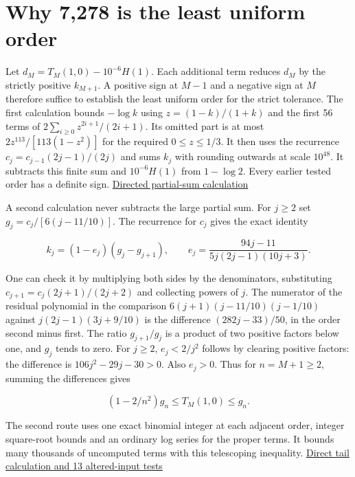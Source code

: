 \clearpage

\section{Why 7,278 is the least uniform order}\label{why-7278-is-the-least-uniform-order}

Let \(d_M=T_M(1,0)-10^{-6}H(1)\). Each additional term reduces \(d_M\) by the strictly positive \(k_{M+1}\). A positive sign at \(M-1\) and a negative sign at \(M\) therefore suffice to establish the least uniform order for the strict tolerance. The first calculation bounds \(-\log k\) using \(z=(1-k)/(1+k)\) and the first 56 terms of \(2\sum_{i\ge0}z^{2i+1}/(2i+1)\). Its omitted part is at most \(2z^{113}/[113(1-z^2)]\) for the required \(0\le z\le1/3\). It then uses the recurrence \(c_j=c_{j-1}(2j-1)/(2j)\) and sums \(k_j\) with rounding outwards at scale \(10^{48}\). It subtracts this finite sum and \(10^{-6}H(1)\) from \(1-\log2\). Every earlier tested order has a definite sign. \href{https://github.com/sepahead/pid-rs/blob/main/audit/research/angular-unit-boundary/prefix_order.py}{Directed partial-sum calculation}

A second calculation never subtracts the large partial sum. For \(j\ge2\) set \(g_j=c_j/[6(j-11/10)]\). The recurrence for \(c_j\) gives the exact identity

\[
k_j=(1-e_j)(g_j-g_{j+1}),\qquad e_j=\frac{94j-11}{5j(2j-1)(10j+3)}.
\]

One can check it by multiplying both sides by the denominators, substituting \(c_{j+1}=c_j(2j+1)/(2j+2)\) and collecting powers of \(j\). The numerator of the residual polynomial in the comparison \(6(j+1)(j-11/10)(j-1/10)\) against \(j(2j-1)(3j+9/10)\) is the difference \((282j-33)/50\), in the order second minus first. The ratio \(g_{j+1}/g_j\) is a product of two positive factors below one, and \(g_j\) tends to zero. For \(j\ge2\), \(e_j<2/j^2\) follows by clearing positive factors: the difference is \(106j^2-29j-30>0\). Also \(e_j>0\). Thus for \(n=M+1\ge2\), summing the differences gives

\[
(1-2/n^2)g_n\le T_M(1,0)\le g_n.
\]

The second route uses one exact binomial integer at each adjacent order, integer square-root bounds and an ordinary log series for the proper terms. It bounds many thousands of uncomputed terms with this telescoping inequality. \href{https://github.com/sepahead/pid-rs/blob/main/audit/research/angular-unit-boundary/judge.py}{Direct tail calculation and 13 altered-input tests}

